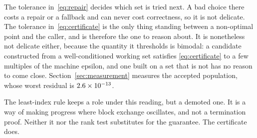 \begin{remark}
\label{rem:tolerances}
The tolerance in~\eqref{eq:repair} decides which set is tried next. A bad choice
there costs a repair or a fallback and can never cost correctness, so it is not
delicate. The tolerance in~\eqref{eq:certificate} is the only thing standing
between a non-optimal point and the caller, and is therefore the one to reason
about. It is nonetheless not delicate either, because the quantity it thresholds
is bimodal: a candidate constructed from a well-conditioned working set satisfies
\eqref{eq:certificate} to a few multiples of the machine epsilon, and one built on
a set that is not has no reason to come close. Section~\ref{sec:measurement}
measures the accepted population, whose worst residual is $2.6\times 10^{-13}$.
\end{remark}

The least-index rule keeps a role under this reading, but a demoted one. It is a
way of making progress where block exchange oscillates, and not a termination
proof. Neither it nor the rank test substitutes for the guarantee. The certificate
does.
